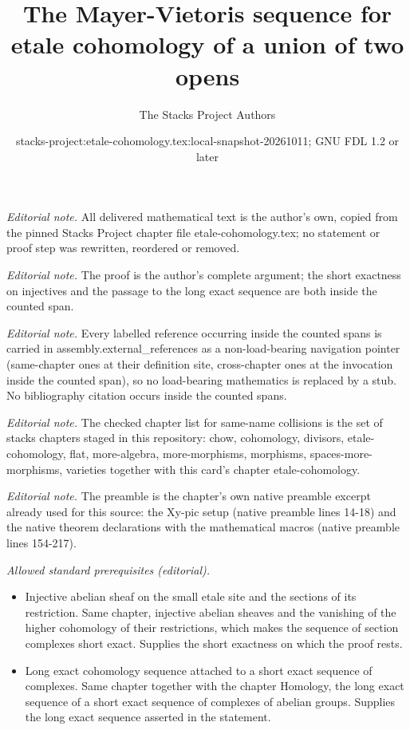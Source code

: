 \documentclass[10pt,a4paper]{amsart}
\title{The Mayer-Vietoris sequence for etale cohomology of a union of two opens}
\author{The Stacks Project Authors}
\date{stacks-project:etale-cohomology.tex:local-snapshot-20261011; GNU FDL 1.2 or later}
\theoremstyle{plain}
\theoremstyle{definition}
\theoremstyle{remark}
\numberwithin{equation}{subsection}
\begin{document}
\maketitle
\noindent\textit{Editorial note.} All delivered mathematical text is the author's own, copied from the pinned Stacks Project chapter file etale-cohomology.tex; no statement or proof step was rewritten, reordered or removed.\par\medskip
\noindent\textit{Editorial note.} The proof is the author's complete argument; the short exactness on injectives and the passage to the long exact sequence are both inside the counted span.\par\medskip
\noindent\textit{Editorial note.} Every labelled reference occurring inside the counted spans is carried in assembly.external\_references as a non-load-bearing navigation pointer (same-chapter ones at their definition site, cross-chapter ones at the invocation inside the counted span), so no load-bearing mathematics is replaced by a stub. No bibliography citation occurs inside the counted spans.\par\medskip
\noindent\textit{Editorial note.} The checked chapter list for same-name collisions is the set of stacks chapters staged in this repository: chow, cohomology, divisors, etale-cohomology, flat, more-algebra, more-morphisms, morphisms, spaces-more-morphisms, varieties together with this card's chapter etale-cohomology.\par\medskip
\noindent\textit{Editorial note.} The preamble is the chapter's own native preamble excerpt already used for this source: the Xy-pic setup (native preamble lines 14-18) and the native theorem declarations with the mathematical macros (native preamble lines 154-217).\par\medskip
\noindent\textit{Allowed standard prerequisites (editorial).}\begin{itemize}
\item Injective abelian sheaf on the small etale site and the sections of its restriction. Same chapter, injective abelian sheaves and the vanishing of the higher cohomology of their restrictions, which makes the sequence of section complexes short exact. Supplies the short exactness on which the proof rests.
\item Long exact cohomology sequence attached to a short exact sequence of complexes. Same chapter together with the chapter Homology, the long exact sequence of a short exact sequence of complexes of abelian groups. Supplies the long exact sequence asserted in the statement.
\end{itemize}\medskip
\end{document}
